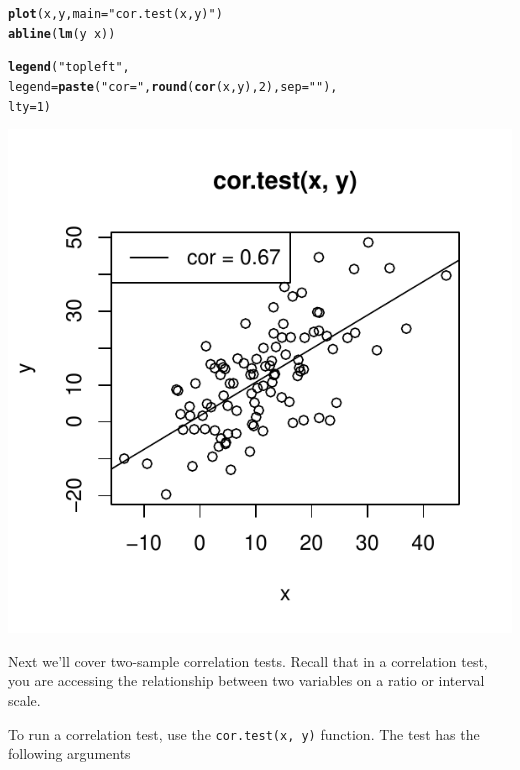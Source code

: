 \documentclass{tufte-book}\usepackage[]{graphicx}\usepackage[]{color}
\makeatletter
\def\maxwidth{ %
  \ifdim\Gin@nat@width>\linewidth
    \linewidth
  \else
    \Gin@nat@width
  \fi
}
\newcommand{\hlnum}[1]{\textcolor[rgb]{0.686,0.059,0.569}{#1}}%
\newcommand{\hlstr}[1]{\textcolor[rgb]{0.192,0.494,0.8}{#1}}%
\newcommand{\hlopt}[1]{\textcolor[rgb]{0,0,0}{#1}}%
\newcommand{\hlstd}[1]{\textcolor[rgb]{0.345,0.345,0.345}{#1}}%
\newcommand{\hlkwc}[1]{\textcolor[rgb]{0.333,0.667,0.333}{#1}}%
\newcommand{\hlkwd}[1]{\textcolor[rgb]{0.737,0.353,0.396}{\textbf{#1}}}%
\newenvironment{kframe}{%
 \def\at@end@of@kframe{}%
 \ifinner\ifhmode%
  \def\at@end@of@kframe{\end{minipage}}%
  \begin{minipage}{\columnwidth}%
 \fi\fi%
 \def\FrameCommand##1{\hskip\@totalleftmargin \hskip-\fboxsep
 \colorbox{shadecolor}{##1}\hskip-\fboxsep
     \hskip-\linewidth \hskip-\@totalleftmargin \hskip\columnwidth}%
 \MakeFramed {\advance\hsize-\width
   \@totalleftmargin\z@ \linewidth\hsize
   \@setminipage}}%
 {\par\unskip\endMakeFramed%
 \at@end@of@kframe}
\newenvironment{knitrout}{}{} %
\makeatother
\begin{document}
\begin{footnotesize}
\begin{marginfigure}
\begin{tiny}
\begin{knitrout}
\begin{kframe}
\begin{alltt}
\hlkwd{plot}\hlstd{(x, y,} \hlkwc{main} \hlstd{=} \hlstr{"cor.test(x, y)"}\hlstd{)}
\hlkwd{abline}\hlstd{(}\hlkwd{lm}\hlstd{(y} \hlopt{~} \hlstd{x))}

\hlkwd{legend}\hlstd{(}\hlstr{"topleft"}\hlstd{,}
       \hlkwc{legend} \hlstd{=} \hlkwd{paste}\hlstd{(}\hlstr{"cor = "}\hlstd{,} \hlkwd{round}\hlstd{(}\hlkwd{cor}\hlstd{(x, y),} \hlnum{2}\hlstd{),} \hlkwc{sep} \hlstd{=} \hlstr{""}\hlstd{),}
       \hlkwc{lty} \hlstd{=} \hlnum{1}\hlstd{)}
\end{alltt}
\end{kframe}
\includegraphics[width=\maxwidth]{figure/unnamed-chunk-227-1} 

\end{knitrout}
\end{tiny}
\end{marginfigure}


Next we'll cover two-sample correlation tests. Recall that in a correlation test, you are accessing the relationship between two variables on a ratio or interval scale.

To run a correlation test, use the \texttt{cor.test(x, y)} function. The test has the following arguments



\end{footnotesize}
\end{document}
